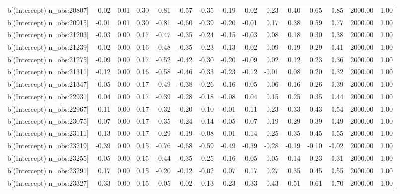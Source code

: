 \begin{table}[ht]
\begin{tabular}{rrrrrrrrrrrrrrr}
  b[(Intercept) n\_obs:20807] & 0.02 & 0.01 & 0.30 & -0.81 & -0.57 & -0.35 & -0.19 & 0.02 & 0.23 & 0.40 & 0.65 & 0.85 & 2000.00 & 1.00 \\ 
  b[(Intercept) n\_obs:20915] & -0.01 & 0.01 & 0.30 & -0.81 & -0.60 & -0.39 & -0.20 & -0.01 & 0.17 & 0.38 & 0.59 & 0.77 & 2000.00 & 1.00 \\ 
  b[(Intercept) n\_obs:21203] & -0.03 & 0.00 & 0.17 & -0.47 & -0.35 & -0.24 & -0.15 & -0.03 & 0.08 & 0.18 & 0.30 & 0.38 & 2000.00 & 1.00 \\ 
  b[(Intercept) n\_obs:21239] & -0.02 & 0.00 & 0.16 & -0.48 & -0.35 & -0.23 & -0.13 & -0.02 & 0.09 & 0.19 & 0.29 & 0.41 & 2000.00 & 1.00 \\ 
  b[(Intercept) n\_obs:21275] & -0.09 & 0.00 & 0.17 & -0.52 & -0.42 & -0.30 & -0.20 & -0.09 & 0.02 & 0.12 & 0.23 & 0.36 & 2000.00 & 1.00 \\ 
  b[(Intercept) n\_obs:21311] & -0.12 & 0.00 & 0.16 & -0.58 & -0.46 & -0.33 & -0.23 & -0.12 & -0.01 & 0.08 & 0.20 & 0.32 & 2000.00 & 1.00 \\ 
  b[(Intercept) n\_obs:21347] & -0.05 & 0.00 & 0.17 & -0.49 & -0.38 & -0.26 & -0.16 & -0.05 & 0.06 & 0.16 & 0.26 & 0.39 & 2000.00 & 1.00 \\ 
  b[(Intercept) n\_obs:22931] & 0.04 & 0.00 & 0.17 & -0.39 & -0.28 & -0.18 & -0.08 & 0.04 & 0.15 & 0.25 & 0.35 & 0.44 & 2000.00 & 1.00 \\ 
  b[(Intercept) n\_obs:22967] & 0.11 & 0.00 & 0.17 & -0.32 & -0.20 & -0.10 & -0.01 & 0.11 & 0.23 & 0.33 & 0.43 & 0.54 & 2000.00 & 1.00 \\ 
  b[(Intercept) n\_obs:23075] & 0.07 & 0.00 & 0.17 & -0.35 & -0.24 & -0.14 & -0.05 & 0.07 & 0.19 & 0.29 & 0.39 & 0.49 & 2000.00 & 1.00 \\ 
  b[(Intercept) n\_obs:23111] & 0.13 & 0.00 & 0.17 & -0.29 & -0.19 & -0.08 & 0.01 & 0.14 & 0.25 & 0.35 & 0.45 & 0.55 & 2000.00 & 1.00 \\ 
  b[(Intercept) n\_obs:23219] & -0.39 & 0.00 & 0.15 & -0.76 & -0.68 & -0.59 & -0.49 & -0.39 & -0.28 & -0.19 & -0.10 & -0.02 & 2000.00 & 1.00 \\ 
  b[(Intercept) n\_obs:23255] & -0.05 & 0.00 & 0.15 & -0.44 & -0.35 & -0.25 & -0.16 & -0.05 & 0.05 & 0.14 & 0.23 & 0.31 & 2000.00 & 1.00 \\ 
  b[(Intercept) n\_obs:23291] & 0.17 & 0.00 & 0.15 & -0.20 & -0.12 & -0.02 & 0.07 & 0.17 & 0.27 & 0.35 & 0.45 & 0.55 & 2000.00 & 1.00 \\ 
  b[(Intercept) n\_obs:23327] & 0.33 & 0.00 & 0.15 & -0.05 & 0.02 & 0.13 & 0.23 & 0.33 & 0.43 & 0.51 & 0.61 & 0.70 & 2000.00 & 1.00 \\ 

\end{tabular}
\end{table}
